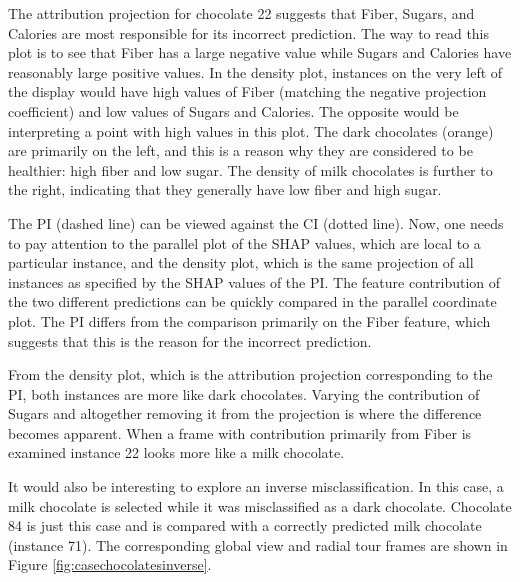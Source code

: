 \documentclass[11pt,twoside]{article}
\begin{document}
The attribution projection for chocolate 22 suggests that Fiber, Sugars, and Calories are most responsible for its incorrect prediction. The way to read this plot is to see that Fiber has a large negative value while Sugars and Calories have reasonably large positive values. In the density plot, instances on the very left of the display would have high values of Fiber (matching the negative projection coefficient) and low values of Sugars and Calories. The opposite would be interpreting a point with high values in this plot. The dark chocolates (orange) are primarily on the left, and this is a reason why they are considered to be healthier: high fiber and low sugar. The density of milk chocolates is further to the right, indicating that they generally have low fiber and high sugar.

The PI (dashed line) can be viewed against the CI (dotted line). Now, one needs to pay attention to the parallel plot of the SHAP values, which are local to a particular instance, and the density plot, which is the same projection of all instances as specified by the SHAP values of the PI. The feature contribution of the two different predictions can be quickly compared in the parallel coordinate plot. The PI differs from the comparison primarily on the Fiber feature, which suggests that this is the reason for the incorrect prediction.

From the density plot, which is the attribution projection corresponding to the PI, both instances are more like dark chocolates. Varying the contribution of Sugars and altogether removing it from the projection is where the difference becomes apparent. When a frame with contribution primarily from Fiber is examined instance 22 looks more like a milk chocolate.

It would also be interesting to explore an inverse misclassification. In this case, a milk chocolate is selected while it was misclassified as a dark chocolate. Chocolate 84 is just this case and is compared with a correctly predicted milk chocolate (instance 71). The corresponding global view and radial tour frames are shown in Figure \ref{fig:casechocolatesinverse}.
\end{document}

